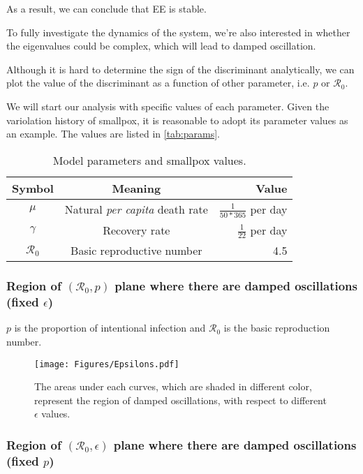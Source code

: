 \documentclass[12pt]{article}
\newcommand{\R}{\mathcal{R}}
\begin{document}
As a result, we can conclude that EE is stable.

To fully investigate the dynamics of the system, we're also interested in whether the eigenvalues could be complex, which will lead to damped oscillation. 

Although it is hard to determine the sign of the discriminant analytically, we can plot the value of the discriminant as a function of other parameter, i.e. $p$ or $\R_0$.

We will start our analysis with specific values of each parameter. Given the variolation history of smallpox, it is reasonable to adopt its parameter values as an example. The values are listed in \autoref{tab:params}.

\begin{table}[H]
\begin{center}
\caption{Model parameters and smallpox values.}
\label{tab:params}
\smallskip
\begin{tabular}{c|c|r}
{\bfseries Symbol} & {\bfseries Meaning} & {\bfseries Value} \\\hline
$\mu$ & Natural \emph{per capita} death rate & $\frac{1}{50*365}$ per day \\
$\gamma$ & Recovery rate & $\frac{1}{22}$ per day \\
$\R_0$ & Basic reproductive number & 4.5
\end{tabular}
\end{center}
\end{table}

\subsubsection{Region of $(\R_0,p)$ plane where there are damped
  oscillations (fixed $\epsilon$)}

$p$ is the proportion of intentional infection and $\R_0$ is the basic reproduction number.

\begin{figure}[h]
  \centering
  \texttt{[image: Figures/Epsilons.pdf]}
  \caption{The areas under each curves, which are shaded in different color, represent the region of damped oscillations, with respect to different $\epsilon$ values.}
\end{figure}

\subsubsection{Region of $(\R_0,\epsilon)$ plane where there are damped
  oscillations (fixed $p$)}
\end{document}
